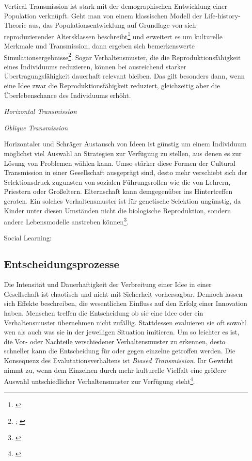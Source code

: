 \documentclass[openany,twoside,twocolumn]{book}
\let\rmarkdownfootnote\footnote%
\def\footnote{\protect\rmarkdownfootnote}
\begin{document}
Vertical Transmission ist stark mit der demographischen Entwicklung
einer Population verknüpft. Geht man von einem klassischen Modell der
Life-history-Theorie aus, das Populationsentwicklung auf Grundlage von
sich reproduzierender Altersklassen beschreibt\footnote{\textcite{leslie_further_1948}}
und erweitert es um kulturelle Merkmale und Transmission, dann ergeben
sich bemerkenswerte Simulationsergebnisse\footnote{\textcite{coratenuto_age_1989};
  \textcite{fogarty_role_2013}}. Sogar Verhaltensmuster, die die
Reproduktionsfähigkeit eines Individuums reduzieren, können bei
ausreichend starker Übertragungsfähigkeit dauerhaft relevant bleiben.
Das gilt besonders dann, wenn eine Idee zwar die Reproduktionsfähigkeit
reduziert, gleichzeitig aber die Überlebenschance des Individuums
erhöht.

\autocite{mulder_intergenerational_2009}

\emph{Horizontal Transmission}

\emph{Oblique Transmission} \autocite{fogarty_evolution_2011}

Horizontaler und Schräger Austausch von Ideen ist günstig um einem
Individuum möglichst viel Auswahl an Strategien zur Verfügung zu
stellen, aus denen es zur Lösung von Problemen wählen kann. Umso stärker
diese Formen der Cultural Transmission in einer Gesellschaft ausgeprägt
sind, desto mehr verschiebt sich der Selektionsdruck zugunsten von
sozialen Führungsrollen wie die von Lehrern, Priestern oder Großeltern.
Elternschaft kann demgegenüber ins Hintertreffen geraten. Ein solches
Verhaltensmuster ist für genetische Selektion ungünstig, da Kinder unter
diesen Umständen nicht die biologische Reproduktion, sondern andere
Lebensmodelle anstreben können\footnote{\textcite{smith_cultural_1992}}.

Social Learning:
\autocites{arbilly_arms_2014}{enquist_evolution_2007}{rendell_cognitive_2011}{rendell_rogers_2010}

\hypertarget{entscheidungsprozesse}{%
\subsection{Entscheidungsprozesse}\label{entscheidungsprozesse}}

Die Intensität und Dauerhaftigkeit der Verbreitung einer Idee in einer
Gesellschaft ist chaotisch und nicht mit Sicherheit vorhersagbar.
Dennoch lassen sich Effekte beschreiben, die wesentlichen Einfluss auf
den Erfolg einer Innovation haben. Menschen treffen die Entscheidung ob
sie eine Idee oder ein Verhaltensmuster übernehmen nicht zufällig.
Stattdessen evaluieren sie oft sowohl wen als auch was sie in der
jeweiligen Situation imitieren. Um so leichter es ist, die Vor- oder
Nachteile verschiedener Verhaltensmuster zu erkennen, desto schneller
kann die Entscheidung für oder gegen einzelne getroffen werden. Die
Konsequenz des Evalutationsverhaltens ist \emph{Biased Transmission}.
Ihr Gewicht nimmt zu, wenn dem Einzelnen durch mehr kulturelle Vielfalt
eine größere Auswahl untschiedlicher Verhaltensmuster zur Verfügung
steht\footnote{\textcite{smith_cultural_1992}}.
\end{document}
